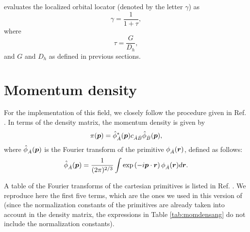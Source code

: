 \DTK{} evaluates the localized orbital locator (denoted by the letter $\gamma$) as
%
\begin{equation}
   \gamma=\frac{1}{1+\tau},
\end{equation}
%
where
%
\begin{equation}
   \tau=\frac{G}{D_h},
\end{equation}
%
and $G$ and $D_h$ as defined in previous sections.

\section{Momentum density}
For the implementation of this field, we closely follow the procedure given in Ref. \cite{bib:kaijser1977}. In terms of the density matrix, the momentum density is given by
%
\begin{equation}\label{eq:momdensdef}
   \pi(\boldsymbol{p})=\hat{\phi}_{\dot{A}}^*(\boldsymbol{p})c_{\dot{A}\dot{B}}\hat{\phi}_{\dot{B}}(\boldsymbol{p}),
\end{equation}
%
where $\hat{\phi}_{\dot{A}}(\boldsymbol{p})$ is the Fourier transform of the primitive $\phi_{\dot{A}}(\boldsymbol{r})$, defined as follows:
%
\begin{equation}
   \hat{\phi}_{\dot{A}}(\boldsymbol{p})=\frac{1}{(2\pi)^{2/3}}\int\exp\left(-i\boldsymbol{p}\cdot\boldsymbol{r}\right)\phi_{\dot{A}}(\boldsymbol{r})d\boldsymbol{r}.
\end{equation}
%

A table of the Fourier transforms of the cartesian primitives is listed in Ref. \cite{bib:kaijser1977}. We reproduce here the first five terms, which are the ones we used in this version of \DTK{} (since the normalization constants of the primitives are already taken into account in the density matrix, the expressions in Table \ref{tab:momdensang} do not include the normalization constants).

